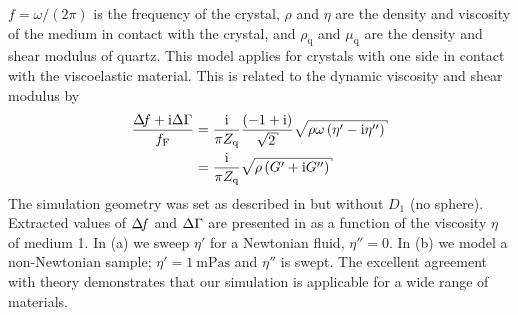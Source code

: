 $f=\omega/(2\pi)$ is the frequency of the crystal, $\rho$ and $\eta$ are the density and viscosity
of the medium in contact with the crystal, and $\rho_\mathrm{q}$ and
$\mu_\mathrm{q}$ are the density and shear modulus of quartz.  This model
applies for crystals with one side in contact with the viscoelastic
material.  This is related to the dynamic viscosity and shear
modulus by
\begin{align}
\frac{\df+\mi\Delta\Gamma}{f_{\mathrm{F}}}&=\frac{\mi}{\pi Z_{\mathrm{q}}}
\frac{\left(-1+\mi\right)}{\sqrt{2}}\sqrt{\rho\omega\left(\eta'-\mi\eta''\right)}\\
&=\frac{\mi}{\pi Z_{\mathrm{q}}}\sqrt{\rho\left(G'+\mi G''\right)}
\label{eqn:viscoshear}
\end{align}
The simulation geometry was set as described in 
but without $D_1$ (no sphere).  Extracted values of $\Delta\!f$ and $\Delta\Gamma$ are
presented in  as a function of the viscosity $\eta$
of medium 1.  In (a) we sweep $\eta'$ for a
Newtonian fluid, $\eta''=0$.  In (b) we model a
non-Newtonian sample; $\eta'=\SI{1}{\milli\pascal\second}$ and $\eta''$ is
swept.  The excellent agreement with theory demonstrates that our
simulation is applicable for a wide range of materials.


